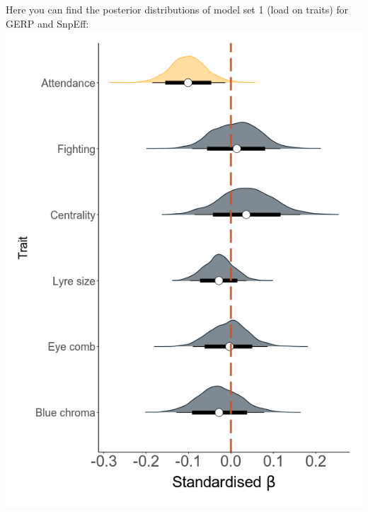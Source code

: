 \documentclass[
  letterpaper,
  DIV=11,
  numbers=noendperiod]{scrreprt}
\begin{document}
Here you can find the posterior distributions of model set 1 (load on
traits) for GERP and SnpEff:
\includegraphics{qmd/../plots/main/fig_3_left_load_traits.png}
\end{document}
